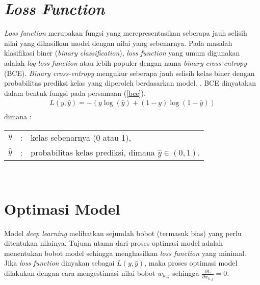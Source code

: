 \documentclass[a4paper,12pt]{report}
\begin{document}
\section{\textit{Loss Function}}
\textit{Loss function} merupakan fungsi yang merepresentasikan seberapa jauh selisih nilai yang dihasilkan model dengan nilai yang sebenarnya. Pada masalah klasifikasi biner (\textit{binary classification}), \textit{loss function} yang umum digunakan adalah \textit{log-loss function} atau lebih populer dengan nama \textit{binary cross-entropy} (BCE). \textit{Binary cross-entropy} mengukur seberapa jauh selisih kelas biner dengan probabilitas prediksi kelas yang diperoleh berdasarkan model. \cite{elharroussLossFunctionsDeep2025}. BCE dinyatakan dalam bentuk fungsi pada persamaan (\ref{bce}).
\begin{equation}
	\begin{split}
		L(y, \hat{y}) = - (y \log(\hat{y}) + (1 - y) \log(1 - \hat{y})) \\
	\end{split}
	\label{bce}
\end{equation}
dimana : \\
\begin{tabular}{p{1cm} p{0.5cm} p{10cm}}
	$y$ &:& kelas sebenarnya (0 atau 1), \\
	$\hat{y}$ &:& probabilitas kelas prediksi, dimana {$\hat{y} \in (0, 1)$}. \\
\end{tabular} \\

\section{Optimasi Model}
Model \textit{deep learning} melibatkan sejumlah bobot (termasuk bias) yang perlu ditentukan nilainya. Tujuan utama dari proses optimasi model adalah menentukan bobot model sehingga menghasilkan \textit{loss function} yang minimal. Jika \textit{loss function} dinyakan sebagai $L(y, \hat{y})$, maka proses optimasi model dilakukan dengan cara mengestimasi nilai bobot $w_{k,j}$ sehingga $\frac{\partial L}{\partial w_{k,j}} = 0$. 
\end{document}
